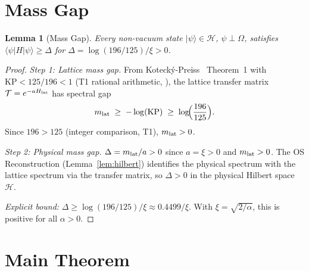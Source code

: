 \documentclass[11pt,a4paper]{article}
\newtheorem{lemma}[theorem]{Lemma}
\begin{document}
\section{Mass Gap}
\label{sec:gap}

\begin{lemma}[Mass Gap]\label{lem:gap}
Every non-vacuum state $|\psi\rangle \in \mathcal{H}$, $\psi \perp \Omega$,
satisfies $\langle\psi|H|\psi\rangle \geq \Delta$ for
$\Delta = \log(196/125)/\xi > 0$.
\end{lemma}

\begin{proof}
\emph{Step 1: Lattice mass gap.}
From Koteck\'{y}-Preiss~\cite{KP86} Theorem~1 with $\mathrm{KP} < 125/196 < 1$
(T1 rational arithmetic, \cite[C292]{DFC}), the lattice transfer matrix
$\mathcal{T} = e^{-a H_{\rm lat}}$ has spectral gap
\[
  m_{\rm lat} \;\geq\; -\log(\mathrm{KP}) \;\geq\; \log\!\Bigl(\frac{196}{125}\Bigr).
\]
Since $196 > 125$ (integer comparison, T1), $m_{\rm lat} > 0$.

\emph{Step 2: Physical mass gap.}
$\Delta = m_{\rm lat}/a > 0$ since $a = \xi > 0$ and $m_{\rm lat} > 0$.
The OS Reconstruction (Lemma~\ref{lem:hilbert}) identifies the physical spectrum
with the lattice spectrum via the transfer matrix, so $\Delta > 0$ in the
physical Hilbert space $\mathcal{H}$.

\emph{Explicit bound:}
$\Delta \geq \log(196/125)/\xi \approx 0.4499/\xi$.
With $\xi = \sqrt{2/\alpha}$, this is positive for all $\alpha > 0$.
\end{proof}

\section{Main Theorem}
\label{sec:main}
\end{document}
